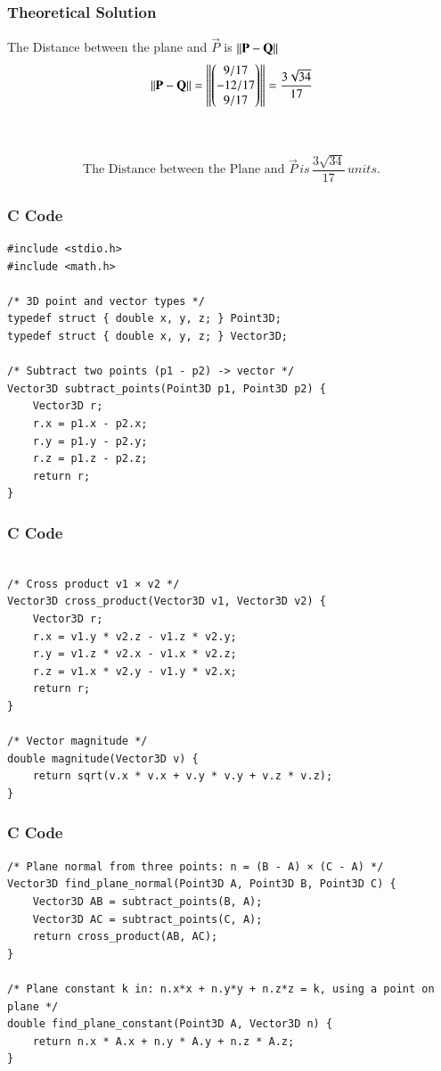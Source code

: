 \documentclass{beamer}
\begin{document}
\begin{frame}[fragile]
    \frametitle{Theoretical Solution}
The Distance between the plane and $\vec{P}$ is $\left\lVert\mathbf{P} - \mathbf{Q}\right\rVert$
\begin{equation}
\left\lVert\mathbf{P} - \mathbf{Q}\right\rVert= \left\lVert\begin{pmatrix}9/17 \\ -12/17 \\ 9/17\end{pmatrix}\right\rVert = \dfrac{3\sqrt{34}}{17}
\end{equation}\\\\


\begin{align}
    \boxed{\text{The Distance between the Plane and } \vec{P} \, is \, \dfrac{3\sqrt{34}}{17} \, units.}
\end{align}
\end{frame}

\begin{frame}[fragile]
    \frametitle{C Code}
    \begin{lstlisting}
#include <stdio.h>
#include <math.h>

/* 3D point and vector types */
typedef struct { double x, y, z; } Point3D;
typedef struct { double x, y, z; } Vector3D;

/* Subtract two points (p1 - p2) -> vector */
Vector3D subtract_points(Point3D p1, Point3D p2) {
    Vector3D r;
    r.x = p1.x - p2.x;
    r.y = p1.y - p2.y;
    r.z = p1.z - p2.z;
    return r;
}
    \end{lstlisting}
\end{frame}

\begin{frame}[fragile]
    \frametitle{C Code}
    \begin{lstlisting}

/* Cross product v1 × v2 */
Vector3D cross_product(Vector3D v1, Vector3D v2) {
    Vector3D r;
    r.x = v1.y * v2.z - v1.z * v2.y;
    r.y = v1.z * v2.x - v1.x * v2.z;
    r.z = v1.x * v2.y - v1.y * v2.x;
    return r;
}

/* Vector magnitude */
double magnitude(Vector3D v) {
    return sqrt(v.x * v.x + v.y * v.y + v.z * v.z);
}
    \end{lstlisting}
\end{frame}

\begin{frame}[fragile]
    \frametitle{C Code}
    \begin{lstlisting}
/* Plane normal from three points: n = (B - A) × (C - A) */
Vector3D find_plane_normal(Point3D A, Point3D B, Point3D C) {
    Vector3D AB = subtract_points(B, A);
    Vector3D AC = subtract_points(C, A);
    return cross_product(AB, AC);
}

/* Plane constant k in: n.x*x + n.y*y + n.z*z = k, using a point on plane */
double find_plane_constant(Point3D A, Vector3D n) {
    return n.x * A.x + n.y * A.y + n.z * A.z;
}
    \end{lstlisting}
\end{frame}
\end{document}

